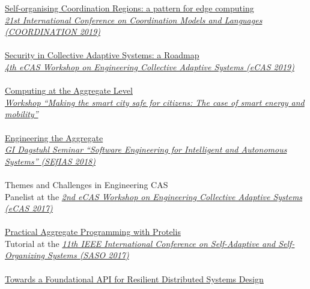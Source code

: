 \href{https://danysk.github.io/Slides-2019-Coordination-SCR/}{Self-organising Coordination Regions: a pattern for edge computing} \\
\href{http://www.discotec.org/2019/coordination.html}{\textit{21st International Conference on Coordination Models and Languages (COORDINATION 2019)}}
\\ \halfblankline \\
\href{https://danysk.github.io/Slides-2019-eCAS-security/}{Security in Collective Adaptive Systems: a Roadmap} \\
\href{https://apice.unibo.it/xwiki/bin/view/ECAS2019/}{\textit{4th eCAS Workshop on Engineering Collective Adaptive Systems (eCAS 2019)}}
\\ \halfblankline \\
\href{https://danysk.github.io/Slides-2018-BISS/}{Computing at the Aggregate Level} \\
\href{https://www.biss-institute.com/wp-content/uploads/2018/07/For-more-information-download-the-brochure.pdf}{\textit{Workshop ``Making the smart city safe for citizens:
The case of smart energy and mobility''}}
\\ \halfblankline \\
\href{https://www.slideshare.net/DanySK/engineering-the-aggregate-talk-at-software-engineering-for-intelligent-and-autonomous-systems-sefias-dagstuhl-2018}{Engineering the Aggregate} \\
\href{https://www.hpi.uni-potsdam.de/giese/public/selfadapt/dagstuhl-seminars/sefias/}{\textit{GI Dagstuhl Seminar ``Software Engineering for Intelligent and Autonomous Systems'' (SEfIAS 2018)}}
\\ \halfblankline \\
Themes and Challenges in Engineering CAS \\
Panelist at the \href{http://apice.unibo.it/xwiki/bin/view/ECAS2017/WebHome}{\textit{2nd eCAS Workshop on Engineering Collective Adaptive Systems (eCAS 2017)}}
\\ \halfblankline \\
\href{https://www.slideshare.net/DanySK/practical-aggregate-programming-with-protelis-saso2017}{Practical Aggregate Programming with Protelis} \\
Tutorial at the \href{http://apice.unibo.it/xwiki/bin/view/ECAS2017/WebHome}{\textit{11th IEEE International Conference on Self-Adaptive and Self-Organizing Systems (SASO 2017)}}
\\ \halfblankline \\
\href{https://www.slideshare.net/DanySK/2nd-ecas-workshop-on-engineering-collective-adaptive-systems}{Towards a Foundational API for Resilient Distributed Systems Design} \\

